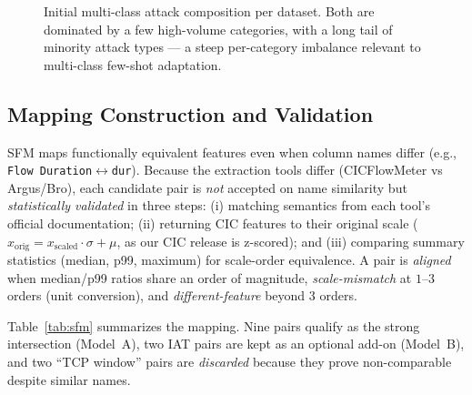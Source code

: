 \documentclass[preprint,12pt,authoryear]{elsarticle}
\begin{document}
\begin{figure}[h]
\centering
\resizebox{0.95\linewidth}{!}{}
\caption{Initial multi-class attack composition per dataset. Both are dominated by
a few high-volume categories, with a long tail of minority attack types --- a steep
per-category imbalance relevant to multi-class few-shot adaptation.}
\label{fig:attackcomp}
\end{figure}

\subsection{Mapping Construction and Validation}
\label{sec:sfmmap}
SFM maps functionally equivalent features even when column names differ (e.g.,
\texttt{Flow Duration}$\leftrightarrow$\texttt{dur}). Because the extraction tools
differ (CICFlowMeter vs Argus/Bro), each candidate pair is \emph{not} accepted on
name similarity but \emph{statistically validated} in three steps: (i) matching
semantics from each tool's official documentation; (ii) returning CIC features to
their original scale ($x_{\text{orig}} = x_{\text{scaled}}\cdot\sigma + \mu$, as our
CIC release is z-scored); and (iii) comparing summary statistics (median, p99,
maximum) for scale-order equivalence. A pair is \emph{aligned} when median/p99 ratios
share an order of magnitude, \emph{scale-mismatch} at $1$--$3$ orders (unit
conversion), and \emph{different-feature} beyond $3$ orders.

Table~\ref{tab:sfm} summarizes the mapping. Nine pairs qualify as the strong
intersection (Model~A), two IAT pairs are kept as an optional add-on (Model~B),
and two ``TCP window'' pairs are \emph{discarded} because they prove
non-comparable despite similar names.
\end{document}

